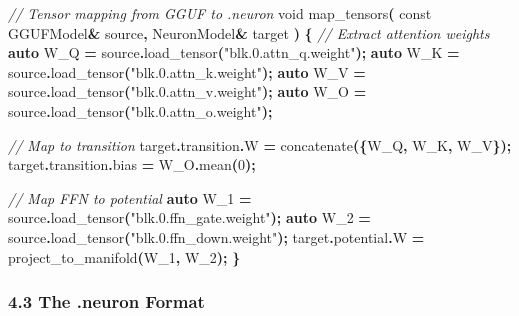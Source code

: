 \documentclass[
  11pt,
  a4paper,
]{article}
\newenvironment{Shaded}{\begin{snugshade}}{\end{snugshade}}
\newcommand{\AttributeTok}[1]{\textcolor[rgb]{0.13,0.29,0.53}{#1}}
\newcommand{\CommentTok}[1]{\textcolor[rgb]{0.56,0.35,0.01}{\textit{#1}}}
\newcommand{\DataTypeTok}[1]{\textcolor[rgb]{0.13,0.29,0.53}{#1}}
\newcommand{\DecValTok}[1]{\textcolor[rgb]{0.00,0.00,0.81}{#1}}
\newcommand{\KeywordTok}[1]{\textcolor[rgb]{0.13,0.29,0.53}{\textbf{#1}}}
\newcommand{\NormalTok}[1]{#1}
\newcommand{\OperatorTok}[1]{\textcolor[rgb]{0.81,0.36,0.00}{\textbf{#1}}}
\newcommand{\StringTok}[1]{\textcolor[rgb]{0.31,0.60,0.02}{#1}}
\begin{document}
\begin{Shaded}
\begin{Highlighting}[]
\CommentTok{// Tensor mapping from GGUF to .neuron}
\DataTypeTok{void}\NormalTok{ map\_tensors}\OperatorTok{(}
    \AttributeTok{const}\NormalTok{ GGUFModel}\OperatorTok{\&}\NormalTok{ source}\OperatorTok{,}
\NormalTok{    NeuronModel}\OperatorTok{\&}\NormalTok{ target}
\OperatorTok{)} \OperatorTok{\{}
    \CommentTok{// Extract attention weights}
    \KeywordTok{auto}\NormalTok{ W\_Q }\OperatorTok{=}\NormalTok{ source}\OperatorTok{.}\NormalTok{load\_tensor}\OperatorTok{(}\StringTok{"blk.0.attn\_q.weight"}\OperatorTok{);}
    \KeywordTok{auto}\NormalTok{ W\_K }\OperatorTok{=}\NormalTok{ source}\OperatorTok{.}\NormalTok{load\_tensor}\OperatorTok{(}\StringTok{"blk.0.attn\_k.weight"}\OperatorTok{);}
    \KeywordTok{auto}\NormalTok{ W\_V }\OperatorTok{=}\NormalTok{ source}\OperatorTok{.}\NormalTok{load\_tensor}\OperatorTok{(}\StringTok{"blk.0.attn\_v.weight"}\OperatorTok{);}
    \KeywordTok{auto}\NormalTok{ W\_O }\OperatorTok{=}\NormalTok{ source}\OperatorTok{.}\NormalTok{load\_tensor}\OperatorTok{(}\StringTok{"blk.0.attn\_o.weight"}\OperatorTok{);}
    
    \CommentTok{// Map to transition}
\NormalTok{    target}\OperatorTok{.}\NormalTok{transition}\OperatorTok{.}\NormalTok{W }\OperatorTok{=}\NormalTok{ concatenate}\OperatorTok{(\{}\NormalTok{W\_Q}\OperatorTok{,}\NormalTok{ W\_K}\OperatorTok{,}\NormalTok{ W\_V}\OperatorTok{\});}
\NormalTok{    target}\OperatorTok{.}\NormalTok{transition}\OperatorTok{.}\NormalTok{bias }\OperatorTok{=}\NormalTok{ W\_O}\OperatorTok{.}\NormalTok{mean}\OperatorTok{(}\DecValTok{0}\OperatorTok{);}
    
    \CommentTok{// Map FFN to potential}
    \KeywordTok{auto}\NormalTok{ W\_1 }\OperatorTok{=}\NormalTok{ source}\OperatorTok{.}\NormalTok{load\_tensor}\OperatorTok{(}\StringTok{"blk.0.ffn\_gate.weight"}\OperatorTok{);}
    \KeywordTok{auto}\NormalTok{ W\_2 }\OperatorTok{=}\NormalTok{ source}\OperatorTok{.}\NormalTok{load\_tensor}\OperatorTok{(}\StringTok{"blk.0.ffn\_down.weight"}\OperatorTok{);}
\NormalTok{    target}\OperatorTok{.}\NormalTok{potential}\OperatorTok{.}\NormalTok{W }\OperatorTok{=}\NormalTok{ project\_to\_manifold}\OperatorTok{(}\NormalTok{W\_1}\OperatorTok{,}\NormalTok{ W\_2}\OperatorTok{);}
\OperatorTok{\}}
\end{Highlighting}
\end{Shaded}

\subsubsection{4.3 The .neuron Format}\label{the-.neuron-format}
\end{document}
